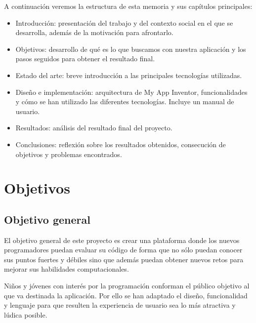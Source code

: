 \documentclass[a4paper, 12pt]{book}
\begin{document}
A continuación veremos la estructura de esta memoria y sus capítulos principales:

\begin{itemize}
  \item Introducción: presentación del trabajo y del contexto social en el que se desarrolla, además de la motivación para afrontarlo.
  
  \item Objetivos: desarrollo de qué es lo que buscamos con nuestra aplicación y los pasos seguidos para obtener el resultado final. 
  
  \item Estado del arte: breve introducción a las principales tecnologías utilizadas. 
  
  \item Diseño e implementación: arquitectura de My App Inventor, funcionalidades y cómo se han utilizado las diferentes tecnologías. Incluye un manual de usuario. 

  \item Resultados: análisis del resultado final del proyecto. 

  \item Conclusiones: reflexión sobre los resultados obtenidos, consecución de objetivos y problemas encontrados.
\end{itemize}




\cleardoublepage
\chapter{Objetivos}
\label{chap:objetivos}

\section{Objetivo general}
\label{sec:objetivo-general} El objetivo general de este proyecto es crear una plataforma donde los nuevos programadores puedan evaluar su código de forma que no sólo puedan conocer sus puntos fuertes y débiles sino que además puedan obtener nuevos retos para mejorar sus habilidades computacionales. 

Niños y jóvenes con interés por la programación conforman el público objetivo al que va destinada la aplicación. Por ello se han adaptado el diseño, funcionalidad y lenguaje para que resulten la experiencia de usuario sea lo más atractiva y lúdica posible. 
\end{document}
